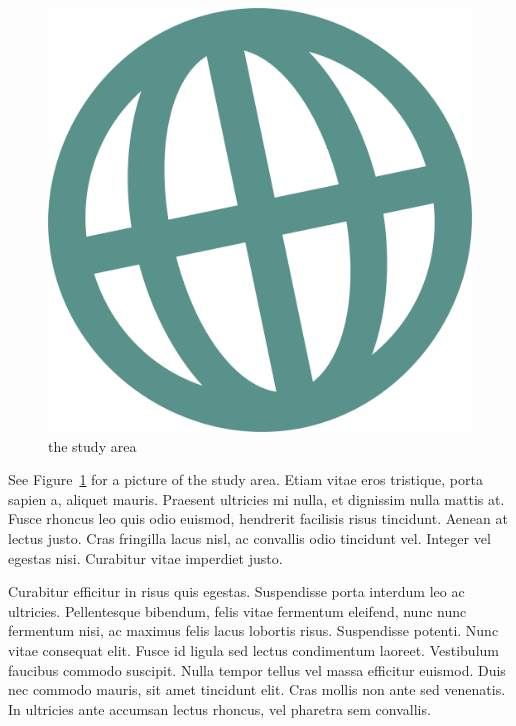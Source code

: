 \documentclass[
  oneside,
  open=any]{scrbook}
\begin{document}
\begin{figure}

{\centering \includegraphics{img/logo.png}

}

\caption{\label{fig-logo}the study area}

\end{figure}

See Figure~\ref{fig-logo} for a picture of the study area. Etiam vitae
eros tristique, porta sapien a, aliquet mauris. Praesent ultricies mi
nulla, et dignissim nulla mattis at. Fusce rhoncus leo quis odio
euismod, hendrerit facilisis risus tincidunt. Aenean at lectus justo.
Cras fringilla lacus nisl, ac convallis odio tincidunt vel. Integer vel
egestas nisi. Curabitur vitae imperdiet justo.

Curabitur efficitur in risus quis egestas. Suspendisse porta interdum
leo ac ultricies. Pellentesque bibendum, felis vitae fermentum eleifend,
nunc nunc fermentum nisi, ac maximus felis lacus lobortis risus.
Suspendisse potenti. Nunc vitae consequat elit. Fusce id ligula sed
lectus condimentum laoreet. Vestibulum faucibus commodo suscipit. Nulla
tempor tellus vel massa efficitur euismod. Duis nec commodo mauris, sit
amet tincidunt elit. Cras mollis non ante sed venenatis. In ultricies
ante accumsan lectus rhoncus, vel pharetra sem convallis.
\end{document}
